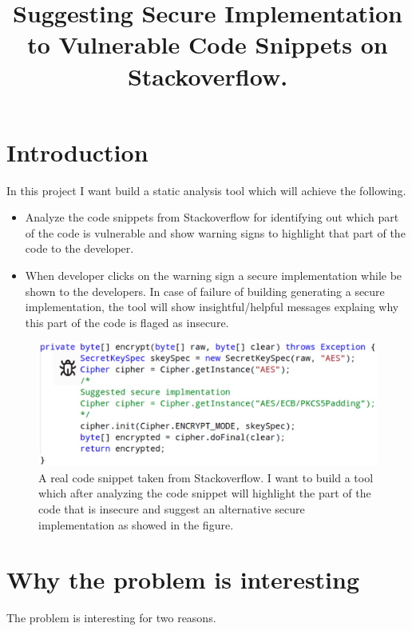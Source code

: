 \documentclass[sigconf]{acmart}
\begin{document}
\title{Suggesting Secure Implementation to Vulnerable Code Snippets on Stackoverflow.}


\maketitle
\section{Introduction}
\label{into}
In this project I want build a static analysis tool which will achieve the following. 
\begin{itemize}
\item  Analyze the code snippets from Stackoverflow for identifying out which part of the code is vulnerable and show warning signs to highlight that part of the code to the developer.
\item When developer clicks on the warning sign a secure implementation while be shown to the developers. In case of failure of building generating a secure implementation, the tool will show insightful/helpful messages explaing why this part of the code is flaged as insecure.  
\end{itemize}

\begin{figure}[ht]
  \centering
  \includegraphics[width=\linewidth]{Figures/Selection_011.png.eps}
  \caption{A real code snippet taken from Stackoverflow. I want to build a tool which after analyzing the code snippet will highlight the part of the code that is insecure and suggest an alternative secure implementation as showed in the figure.}
  \label{fig:motivating-example}
\end{figure}

\section{Why the problem is interesting}
The problem is interesting for two reasons. 
\end{document}
